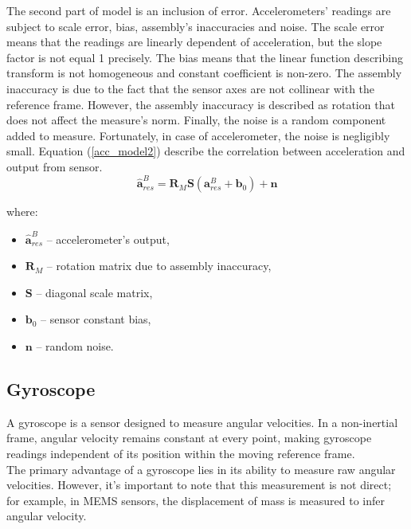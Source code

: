 The second part of model is an inclusion of error. Accelerometers' readings are subject to scale error, bias, assembly's inaccuracies and noise.
The scale error means that the readings are linearly dependent of acceleration, but the slope factor is not equal 1 precisely. The bias means that the linear function describing transform is not homogeneous and constant coefficient is non-zero. The assembly inaccuracy is due to the fact that the sensor axes are not collinear with the reference frame. However, the assembly inaccuracy is described as rotation that does not affect the measure's norm. Finally, the noise is a random component added to measure. Fortunately, in case of accelerometer, the noise is negligibly small. Equation (\ref{acc_model2}) describe the correlation between acceleration and output from sensor.\\


\begin{equation}
	\bm{\hat{a}}_{res}^B = \bm{R}_M \bm{S} \left( \bm{a}_{res}^B + \bm{b}_0 \right) + \bm{n}
	\label{acc_model2}
\end{equation}

where:
\begin{itemize}
	\item $\bm{\hat{a}}_{res}^B$ -- accelerometer's output,
	\item $\bm{R}_M$ -- rotation matrix due to assembly inaccuracy,
	\item $\bm{S}$ -- diagonal scale matrix,
	\item $\bm{b}_0$ -- sensor constant bias,
	\item $\bm{n}$ -- random noise.	
\end{itemize}



\subsection{Gyroscope}
A gyroscope is a sensor designed to measure angular velocities. In a non-inertial frame, angular velocity remains constant at every point, making gyroscope readings independent of its position within the moving reference frame.\\

The primary advantage of a gyroscope lies in its ability to measure raw angular velocities. However, it's important to note that this measurement is not direct; for example, in MEMS sensors, the displacement of mass is measured to infer angular velocity.\\

